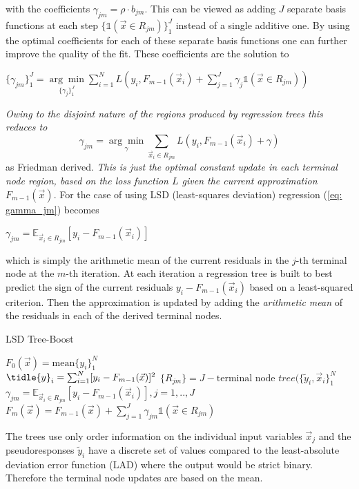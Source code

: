 \documentclass[12pt, a4paper]{article}
\begin{document}
with the coefficients $\gamma_{jm} = \rho \cdot b_{jm}$. This can be viewed as adding $J$ separate basis functions at each step $\{\mathds{1}(\vec{x} \in R_{jm})\}_1^J$ instead of a single additive one. By using the optimal coefficients for each of these separate basis functions  one can further improve the quality of the fit.
These coefficients are the solution to 
\begin{center}
    $\{\gamma_{jm}\}_1^J = \underset{\{\gamma_j\}_1^J}{\arg\min} \sum_{i=1}^N L\left(y_i,F_{m-1}(\vec{x}_i) + \sum_{j=1}^J \gamma_j \mathds{1}(\vec{x} \in R_{jm})\right)$
\end{center}
\textit{Owing to the disjoint nature of the regions produced by regression trees this reduces to}
\begin{equation}
        \label{eq: gamma_jm}
        \gamma_{jm} = \underset{\gamma}{\arg\min} \sum_{\vec{x}_i \in R_{jm}} L\left(y_i,F_{m-1}(\vec{x}_i) + \gamma\right)
\end{equation}
as Friedman \cite{Friedman2001} derived.
\textit{This is just the optimal constant update in each terminal node region, based on the loss function $L$ given the current approximation $F_{m-1}(\vec{x})$}. For the case of using LSD (least-squares deviation) regression (\ref{eq: gamma_jm}) becomes 
\begin{center}
    $\gamma_{jm} = \mathbb{E}_{\vec{x}_i \in R_{jm}}[y_i - F_{m-1}(\vec{x}_i)]$
\end{center}
which is simply the arithmetic mean of the current residuals in the $j$-th terminal node at the $m$-th iteration. At each iteration a regression tree is built to best predict the sign of the current residuals $y_i - F_{m-1}(\vec{x}_i)$ based on a least-squared criterion. Then the approximation is updated by adding the \textit{arithmetic mean} of the residuals in each of the derived terminal nodes.
\begin{algorithm}
\caption{LSD Tree-Boost}\label{alg: lsd_tree_boost_algo}
    $F_0(\vec{x}) = \text{mean}\{y_i\}_1^N$ \\
    {
    $\tidle{y}_i = \sum_{i=1}^N [y_i - F_{m-1}(\vec{x})]^2$
    $\{R_{jm}\} = J-\text{terminal node } tree(\{\tilde{y}_i,\vec{x}_i\}_1^N$
    $\gamma_{jm} = \mathbb{E}_{\vec{x}_i \in R_{jm}}[y_i - F_{m-1}(\vec{x}_i)] , j = 1,..,J$
    $F_m(\vec{x}) = F_{m-1}(\vec{x}) + \sum_{j=1}^J \gamma_{jm} \mathds{1}(\vec{x} \in R_{jm})$
    }
\end{algorithm}
The trees use only order information on the individual input variables $\vec{x}_j$ and the pseudoresponses $\tilde{y}_i$ have a discrete set of values compared to the least-absolute deviation error function (LAD) where the output would be strict binary. Therefore the terminal node updates are based on the mean.
\newpage
\end{document}
